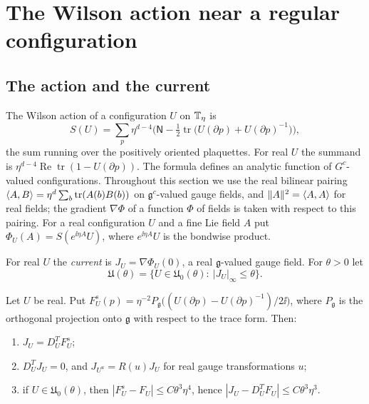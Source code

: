 \section{The Wilson action near a regular configuration}\label{sec:action}

\subsection{The action and the current}

The Wilson action of a configuration $U$ on $\mathbb T_\eta$ is
\[
S(U)=\sum_p\eta^{d-4}\Big(\mathsf N-\tfrac12\operatorname{tr}\big(U(\partial p)+U(\partial p)^{-1}\big)\Big),
\]
the sum running over the positively oriented plaquettes. For real $U$ the summand is $\eta^{d-4}\operatorname{Re}\operatorname{tr}(1-U(\partial p))$. The formula defines an analytic function of $G^c$-valued configurations. Throughout this section we use the real bilinear pairing $\langle A,B\rangle=\eta^d\sum_b\operatorname{tr}(A(b)B(b))$ on $\mathfrak g^c$-valued gauge fields, and $\|A\|^2=\langle A,A\rangle$ for real fields; the gradient $\nabla\Phi$ of a function $\Phi$ of fields is taken with respect to this pairing. For a real configuration $U$ and a fine Lie field $A$ put $\Phi_U(A)=S(e^{\ii\eta A}U)$, where $e^{\ii\eta A}U$ is the bondwise product.

\begin{definition}\label{def:current}
For real $U$ the \emph{current} is $J_U=\nabla\Phi_U(0)$, a real $\mathfrak g$-valued gauge field. For $\theta>0$ let
\[
\mathfrak U(\theta)=\{U\in\mathfrak U_0(\theta):\ |J_U|_\infty\le\theta\}.
\]
\end{definition}

\begin{lemma}\label{lem:current}
Let $U$ be real. Put $F^s_U(p)=\eta^{-2}P_{\mathfrak g}\big((U(\partial p)-U(\partial p)^{-1})/2\ii\big)$, where $P_{\mathfrak g}$ is the orthogonal projection onto $\mathfrak g$ with respect to the trace form. Then:
\begin{enumerate}[label=(\alph*)]
\item $J_U=D_U^TF^s_U$;
\item $D_U^TJ_U=0$, and $J_{U^u}=R(u)J_U$ for real gauge transformations $u$;
\item if $U\in\mathfrak U_0(\theta)$, then $|F^s_U-F_U|\le C\theta^3\eta^4$, hence $|J_U-D^T_UF_U|\le C\theta^3\eta^3$.
\end{enumerate}
\end{lemma}

